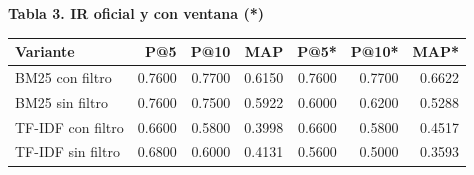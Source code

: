\par\medskip\noindent\begin{minipage}{\linewidth}
\textbf{Tabla 3. IR oficial y con ventana (*)}\par\smallskip
\begin{tabularx}{\linewidth}{@{}Yrrrrrr@{}}\toprule
Variante & P@5 & P@10 & MAP & P@5* & P@10* & MAP* \\ \midrule
BM25 con filtro & 0.7600 & 0.7700 & 0.6150 & 0.7600 & 0.7700 & 0.6622 \\
BM25 sin filtro & 0.7600 & 0.7500 & 0.5922 & 0.6000 & 0.6200 & 0.5288 \\
TF-IDF con filtro & 0.6600 & 0.5800 & 0.3998 & 0.6600 & 0.5800 & 0.4517 \\
TF-IDF sin filtro & 0.6800 & 0.6000 & 0.4131 & 0.5600 & 0.5000 & 0.3593 \\
\bottomrule\end{tabularx}\end{minipage}\par\medskip

